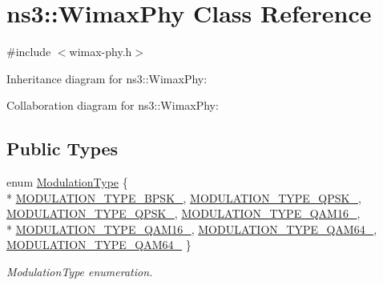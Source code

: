 \hypertarget{classns3_1_1WimaxPhy}{}\section{ns3\+:\+:Wimax\+Phy Class Reference}
\label{classns3_1_1WimaxPhy}


{\ttfamily \#include $<$wimax-\/phy.\+h$>$}



Inheritance diagram for ns3\+:\+:Wimax\+Phy\+:


Collaboration diagram for ns3\+:\+:Wimax\+Phy\+:
\subsection*{Public Types}
\begin{DoxyCompactItemize}
\item 
enum \hyperlink{classns3_1_1WimaxPhy_a044c5d8a48ca992c39c2a946f6e755fa}{Modulation\+Type} \{ \\*
\hyperlink{classns3_1_1WimaxPhy_a044c5d8a48ca992c39c2a946f6e755faaef0b78541d9b66d4e85780131e665028}{M\+O\+D\+U\+L\+A\+T\+I\+O\+N\+\_\+\+T\+Y\+P\+E\+\_\+\+B\+P\+S\+K\+\_}, 
\hyperlink{classns3_1_1WimaxPhy_a044c5d8a48ca992c39c2a946f6e755faa21f9f78031cd1105c0ff97c9df57de1d}{M\+O\+D\+U\+L\+A\+T\+I\+O\+N\+\_\+\+T\+Y\+P\+E\+\_\+\+Q\+P\+S\+K\+\_}, 
\hyperlink{classns3_1_1WimaxPhy_a044c5d8a48ca992c39c2a946f6e755faaed15df1f1feb034c0f69dc5e44d05834}{M\+O\+D\+U\+L\+A\+T\+I\+O\+N\+\_\+\+T\+Y\+P\+E\+\_\+\+Q\+P\+S\+K\+\_}, 
\hyperlink{classns3_1_1WimaxPhy_a044c5d8a48ca992c39c2a946f6e755faa3b72d83f9fc0c4f964a939a0aa2df5af}{M\+O\+D\+U\+L\+A\+T\+I\+O\+N\+\_\+\+T\+Y\+P\+E\+\_\+\+Q\+A\+M16\+\_}, 
\\*
\hyperlink{classns3_1_1WimaxPhy_a044c5d8a48ca992c39c2a946f6e755faa821f09b9921774eb6875b7ec4686ab58}{M\+O\+D\+U\+L\+A\+T\+I\+O\+N\+\_\+\+T\+Y\+P\+E\+\_\+\+Q\+A\+M16\+\_}, 
\hyperlink{classns3_1_1WimaxPhy_a044c5d8a48ca992c39c2a946f6e755faadc970aa3e5c6c6774cc30daf2c9e176f}{M\+O\+D\+U\+L\+A\+T\+I\+O\+N\+\_\+\+T\+Y\+P\+E\+\_\+\+Q\+A\+M64\+\_}, 
\hyperlink{classns3_1_1WimaxPhy_a044c5d8a48ca992c39c2a946f6e755faa6d659f22bcedc066aa831271b75734a9}{M\+O\+D\+U\+L\+A\+T\+I\+O\+N\+\_\+\+T\+Y\+P\+E\+\_\+\+Q\+A\+M64\+\_}
 \}\begin{DoxyCompactList}\small\item\em Modulation\+Type enumeration. \end{DoxyCompactList}
\item 

\end{DoxyCompactItemize}
